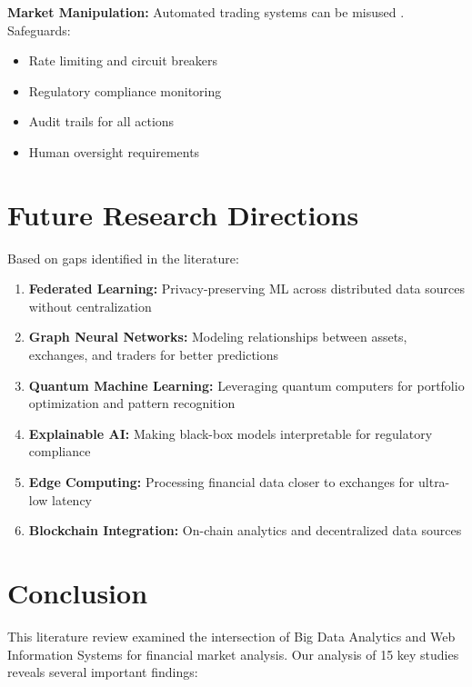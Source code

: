 \documentclass[conference]{IEEEtran}
\begin{document}
\textbf{Market Manipulation:} Automated trading systems can be misused \cite{zhang2023ensemble}. Safeguards:
\begin{itemize}
    \item Rate limiting and circuit breakers
    \item Regulatory compliance monitoring
    \item Audit trails for all actions
    \item Human oversight requirements
\end{itemize}

\section{Future Research Directions}

Based on gaps identified in the literature:

\begin{enumerate}
    \item \textbf{Federated Learning:} Privacy-preserving ML across distributed data sources without centralization
    
    \item \textbf{Graph Neural Networks:} Modeling relationships between assets, exchanges, and traders for better predictions
    
    \item \textbf{Quantum Machine Learning:} Leveraging quantum computers for portfolio optimization and pattern recognition
    
    \item \textbf{Explainable AI:} Making black-box models interpretable for regulatory compliance
    
    \item \textbf{Edge Computing:} Processing financial data closer to exchanges for ultra-low latency
    
    \item \textbf{Blockchain Integration:} On-chain analytics and decentralized data sources
\end{enumerate}

\section{Conclusion}

This literature review examined the intersection of Big Data Analytics and Web Information Systems for financial market analysis. Our analysis of 15 key studies reveals several important findings:
\end{document}

